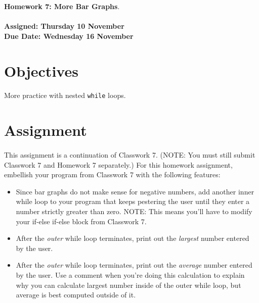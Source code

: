 \documentclass[letter,11pt]{article}
\begin{document}
\huge
\textbf{Homework 7: More Bar Graphs}.
\normalsize
\\ ~~ \\
\textbf{Assigned: Thursday 10 November} \\
\textbf{Due Date: Wednesday 16 November}

\section*{Objectives}
\paragraph{}More practice with nested \texttt{while} loops.

\section*{Assignment}
\paragraph{}This assignment is a continuation of Classwork 7. (NOTE: You must still submit Classwork 7 and Homework 7 separately.) For this homework assignment, embellish your program from Classwork 7 with the following features:
\begin{itemize}
    \item Since bar graphs do not make sense for negative numbers, add another inner while loop to your program that keeps pestering the user until they enter a number strictly greater than zero. NOTE: This means you’ll have to modify your if-else if-else block from Classwork 7.
    \item After the \textit{outer} while loop terminates, print out the \textit{largest} number entered by the user.
    \item After the \textit{outer} while loop terminates, print out the \textit{average} number entered by the user. Use a comment when you're doing this calculation to explain why you can calculate largest number inside of the outer while loop, but average is best computed outside of it.
\end{itemize}
\end{document}
